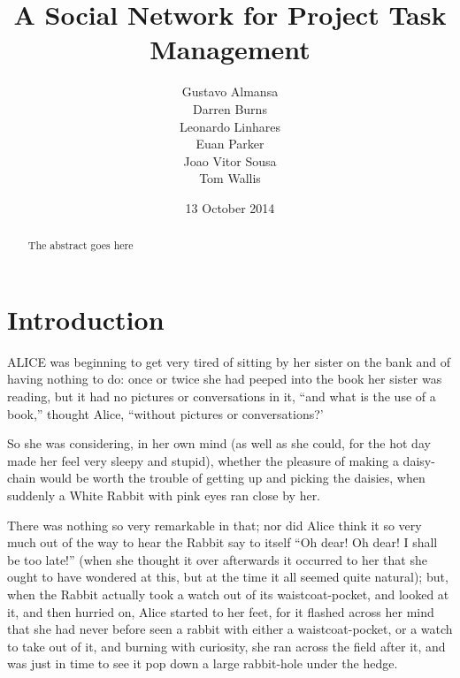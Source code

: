 \documentclass{l3proj}
\begin{document}
\title{A Social Network for Project Task Management}
\author{Gustavo Almansa\\
        Darren Burns \\
        Leonardo Linhares \\
        Euan Parker \\
        Joao Vitor Sousa \\
	Tom Wallis \\
}
\date{13 October 2014}
\maketitle
\begin{abstract}

The abstract goes here

\end{abstract}
\educationalconsent
\tableofcontents
\chapter{Introduction}
\label{intro}

ALICE \cite{alice} was beginning to get very tired of sitting by her sister
on the bank and of having nothing to do: once or twice she had peeped into
the book her sister was reading, but it had no pictures or conversations in
it, ``and what is the use of a book,'' thought Alice, ``without pictures or
conversations?'

So she was considering, in her own mind (as well as she could, for the hot
day made her feel very sleepy and stupid), whether the pleasure of making a
daisy-chain would be worth the trouble of getting up and picking the
daisies, when suddenly a White Rabbit with pink eyes ran close by her.

There was nothing so very remarkable in that; nor did Alice think it so
very much out of the way to hear the Rabbit say to itself ``Oh dear! Oh
dear! I shall be too late!'' (when she thought it over afterwards it
occurred to her that she ought to have wondered at this, but at the time it
all seemed quite natural); but, when the Rabbit actually took a watch out
of its waistcoat-pocket, and looked at it, and then hurried on, Alice
started to her feet, for it flashed across her mind that she had never
before seen a rabbit with either a waistcoat-pocket, or a watch to take out
of it, and burning with curiosity, she ran across the field after it, and
was just in time to see it pop down a large rabbit-hole under the hedge.
\end{document}
